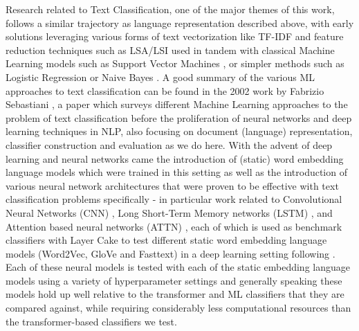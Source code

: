 \documentclass[final]{clv2025}
\begin{document}
Research related to Text Classification, one of the major themes of this work, follows a similar trajectory as language representation described above, with early solutions leveraging various forms of text vectorization like TF-IDF \cite{sparckjones1972statistical} and feature reduction techniques such as LSA/LSI \cite{deerwester} used in tandem with classical Machine Learning models such as Support Vector Machines \cite{joachims1998text}, or simpler methods such as Logistic Regression or Naive Bayes \cite{mccallum1998comparison}. A good summary of the various ML approaches to text classification can be found in the 2002 work by Fabrizio Sebastiani \cite{sebastiani2002machine}, a paper which surveys different Machine Learning approaches to the problem of text classification before the proliferation of neural networks and deep learning techniques in NLP, also focusing on document (language) representation, classifier construction and evaluation as we do here. With the advent of deep learning and neural networks came the introduction of (static) word embedding language models which were trained in this setting as well as the introduction of various neural network architectures that were proven to be effective with text classification problems specifically - in particular work related to Convolutional Neural Networks (CNN) \cite{yoon2014convolutional} \cite{zhang2015character}, Long Short-Term Memory networks (LSTM) \cite{zang2021research}, and Attention based neural networks (ATTN) \cite{liuguo2019bidirectional}, each of which is used as benchmark classifiers with Layer Cake to test different static word embedding language models (Word2Vec, GloVe and Fasttext) in a deep learning setting following \cite{moreo2021}. Each of these neural models is tested with each of the static embedding language models using a variety of hyperparameter settings and generally speaking these models hold up well relative to the transformer and ML classifiers that they are compared against, while requiring considerably less computational resources than the transformer-based classifiers we test.
\end{document}
